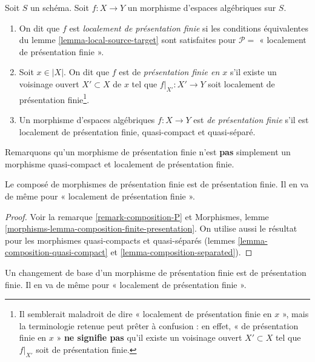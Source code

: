 \begin{definition}
\label{definition-locally-finite-presentation}
Soit $S$ un schéma.
Soit $f : X \to Y$ un morphisme d'espaces algébriques sur $S$.
\begin{enumerate}
\item On dit que $f$ est {\it localement de présentation finie} si
les conditions équivalentes du
lemme \ref{lemma-local-source-target}
sont satisfaites pour $\mathcal{P} =$ « localement de présentation finie ».
\item Soit $x \in |X|$. On dit que $f$ est de {\it présentation finie en $x$}
s'il existe un voisinage ouvert $X' \subset X$ de $x$ tel
que $f|_{X'} : X' \to Y$ soit localement de
présentation finie\footnote{Il semblerait maladroit de dire « localement de présentation finie
en $x$ », mais la terminologie retenue peut prêter à confusion : en effet,
« de présentation finie en $x$ » {\bf ne signifie pas} qu'il existe
un voisinage ouvert $X' \subset X$ tel que $f|_{X'}$ soit de présentation
finie.}.
\item Un morphisme d'espaces algébriques $f : X \to Y$ est
{\it de présentation finie}
s'il est localement de présentation finie, quasi-compact et
quasi-séparé.
\end{enumerate}
\end{definition}

\noindent
Remarquons qu'un morphisme de présentation finie n'est {\bf pas} simplement un morphisme
quasi-compact et localement de présentation finie.

\begin{lemma}
\label{lemma-composition-finite-presentation}
Le composé de morphismes de présentation finie est de présentation finie.
Il en va de même pour « localement de présentation finie ».
\end{lemma}

\begin{proof}
Voir la remarque \ref{remark-composition-P} et
Morphismes, lemme \ref{morphisms-lemma-composition-finite-presentation}.
On utilise aussi le résultat pour les morphismes quasi-compacts et quasi-séparés
(lemmes \ref{lemma-composition-quasi-compact} et
\ref{lemma-composition-separated}).
\end{proof}

\begin{lemma}
\label{lemma-base-change-finite-presentation}
Un changement de base d'un morphisme de présentation finie est de présentation finie.
Il en va de même pour « localement de présentation finie ».
\end{lemma}

